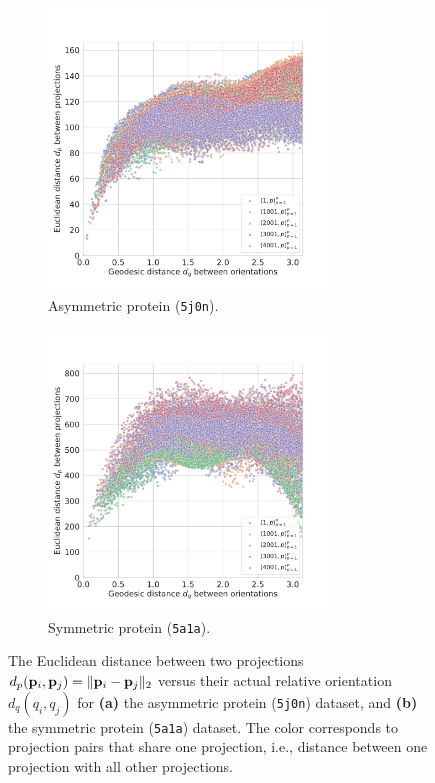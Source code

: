 \begin{figure}[ht!]
    \centering
    \begin{subfigure}[t]{0.45\textwidth}
        \includegraphics[height=7.5cm]{figures/eucl_notrobust_5j0n}
        \caption{Asymmetric protein (\texttt{5j0n}).}
    \end{subfigure}
    \hfill
    \begin{subfigure}[t]{0.45\textwidth}
        \includegraphics[height=7.5cm]{figures/eucl_notrobust_5a1a}
        \caption{Symmetric protein (\texttt{5a1a}).}
    \end{subfigure}
    \caption{
        The Euclidean distance between two projections $d_p(\mathbf{p}_i, \mathbf{p}_j) = \Vert \mathbf{p}_i - \mathbf{p}_j \Vert_2$ versus their actual relative orientation $d_q(q_i, q_j)$ for \textbf{(a)} the asymmetric protein (\texttt{5j0n}) dataset, and \textbf{(b)} the symmetric protein (\texttt{5a1a}) dataset.
        The color corresponds to projection pairs that share one projection, i.e., distance between one projection with all other projections.
    }\label{fig:euclidean-not-robust}
\end{figure}

